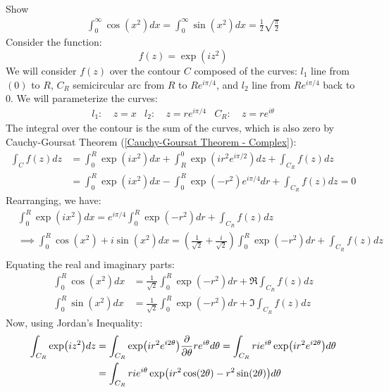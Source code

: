 \documentclass[12pt, english]{book}
\begin{document}
	\begin{example}
	\label{Fresnel Integrals Derivation Example - Complex}
	Show
	\begin{align*}
		\int_{0}^{\infty} \cos(x^2) dx = \int_{0}^{\infty} \sin(x^2) dx 
		= \frac{1}{2}\sqrt{\frac{\pi}{2}}
	\end{align*}
	{\color{Grey}
	Consider the function: \[f(z) = \exp(iz^2)\]
	We will consider \(f(z)\) over the contour \(C\) composed of the curves: \(l_1\) line from \((0)\) to \(R\), \(C_R\) semicircular arc from \(R\) to \(Re^{i\pi/4}\), and \(l_2\) line from \(Re^{i\pi/4}\) back to \(0\). We will parameterize the curves:
	\begin{align*}
		l_1: &\ z=x 	&
		l_2: &\ z=re^{i\pi/4} &
		C_R: &\ z=re^{i\theta}
	\end{align*}
	The integral over the contour is the sum of the curves, which is also zero by Cauchy-Goursat Theorem (\cref{Cauchy-Goursat Theorem - Complex}): 
	\begin{align*}
		\int_{C} f(z) dz
		&= \int_{0}^{R} \exp(ix^2) dx + \int_{R}^{0} \exp(ir^2 e^{i\pi/2}) dz + \int_{C_R} f(z) dz \\
		&= \int_{0}^{R} \exp(ix^2) dx - \int_{0}^{R} \exp(-r^2) e^{i\pi/4} dr + \int_{C_R} f(z) dz = 0
	\end{align*}
	Rearranging, we have:
	\begin{align*}
		&\int_{0}^{R} \exp(ix^2) dx = e^{i\pi/4} \int_{0}^{R} \exp(-r^2) dr + \int_{C_R} f(z) dz \\
		&\implies \int_{0}^{R} \cos(x^2) + i\sin(x^2) dx
		= \left(\frac{1}{\sqrt{2}} + \frac{i}{\sqrt{2}} \right) \int_{0}^{R} \exp(-r^2) dr + \int_{C_R} f(z) dz \\
	\end{align*}
	Equating the real and imaginary parts:
	\begin{align*}
		\int_{0}^{R} \cos(x^2) dx 
		&= \frac{1}{\sqrt{2}} \int_{0}^{R} \exp(-r^2) dr + \Re{\int_{C_R} f(z) dz} \\
		\int_{0}^{R} \sin(x^2) dx 
		&= \frac{1}{\sqrt{2}} \int_{0}^{R} \exp(-r^2) dr + \Im{\int_{C_R} f(z) dz}
	\end{align*}
	Now, using Jordan's Inequality:
	\begin{align*}
		\int_{C_R} \exp(iz^2) dz 
		&= \int_{C_R} \exp(ir^2 e^{i2\theta}) \pdv{\theta} re^{i\theta} d\theta 
		 = \int_{C_R} rie^{i\theta} \exp(ir^2e^{i2\theta}) d\theta \\
		&= \int_{C_R} rie^{i\theta} \exp(ir^2\cos(2\theta) - r^2\sin(2\theta)) d\theta \\

\end{align*}}
\end{example}
\end{document}
